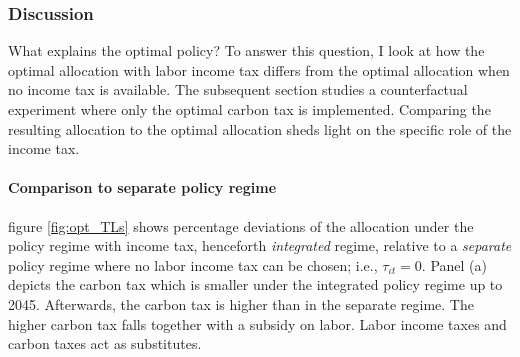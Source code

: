 \subsubsection{Discussion}\label{subsec:dis}

 What explains the optimal policy? To answer this question, I look at how the optimal allocation with labor income tax differs from the optimal allocation when no income tax is available. 
 The subsequent section studies a counterfactual experiment where only the optimal carbon tax is implemented. Comparing the resulting allocation to the optimal allocation sheds light on the specific role of the income tax. 


	
\paragraph{Comparison to separate policy regime}

figure \ref{fig:opt_TLs} shows percentage deviations of the allocation under the policy regime with income tax, henceforth \textit{integrated} regime, relative to a \textit{separate} policy regime where no labor income tax can be chosen; i.e., $\tau_{\iota t}=0$.  
Panel (a) depicts the carbon tax which is smaller under the integrated policy regime up to 2045. Afterwards, the carbon tax is higher than in the separate regime. The higher carbon tax falls together with a subsidy on labor.
Labor income taxes and carbon taxes act as substitutes. 


